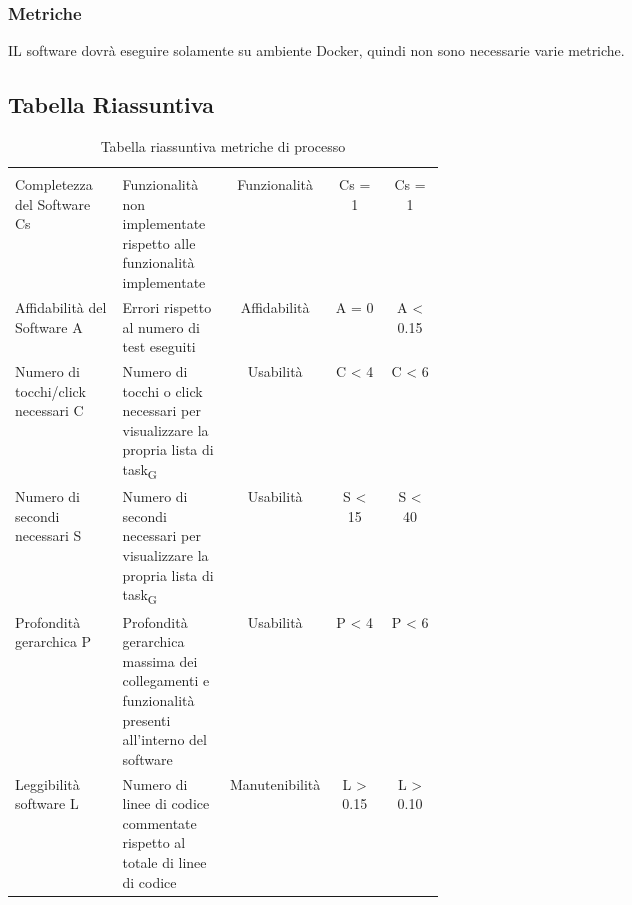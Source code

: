 \subsubsection{Metriche}
IL software dovrà eseguire solamente su ambiente Docker, quindi non sono necessarie varie metriche.
\subsection{Tabella Riassuntiva}
\begin{table}[H]
	\begin{center}
		\caption{Tabella riassuntiva metriche di processo}
		\begin{tabular}{p{0.25\linewidth} p{0.25\linewidth}c!{\color[HTML]{9b240a}\vrule width 0.05cm}cc}
			\rowcolorhead
			 &  &  &  & \\
			
			Completezza del Software Cs & Funzionalità non implementate rispetto alle funzionalità implementate & Funzionalità & Cs = 1 & Cs = 1\\
			Affidabilità del Software A & Errori rispetto al numero di test eseguiti & Affidabilità & A = 0 & A < 0.15\\
			Numero di tocchi/click necessari C & Numero di tocchi o click necessari per visualizzare la propria lista di \gls{task}\textsubscript{G} & Usabilità & C < 4 & C < 6\\
			Numero di secondi necessari S & Numero di secondi necessari per visualizzare la propria lista di \gls{task}\textsubscript{G} & Usabilità & S < 15 & S < 40\\
			Profondità gerarchica P & Profondità gerarchica massima dei collegamenti e funzionalità presenti all'interno del software & Usabilità & P < 4 & P < 6\\
			Leggibilità software L & Numero di linee di codice commentate rispetto al totale di linee di codice & Manutenibilità & L > 0.15 & L > 0.10\\	
		\end{tabular}
		
	\end{center}
\end{table}
